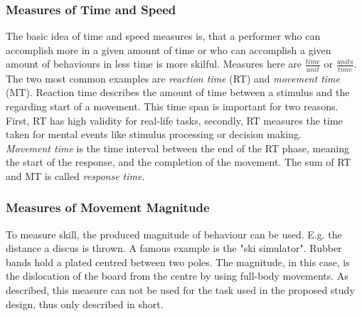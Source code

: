 \subsubsection{Measures of Time and Speed}
\label{section:timeandspeed}
The basic idea of time and speed measures is, that a performer who can accomplish more in a given amount of time or who can accomplish a given amount of behaviours in less time is more skilful. Measures here are
$\frac{time}{unit}$ or $\frac{units}{time}$.\\
The two most common examples are \textit{reaction time} (RT) and \textit{movement time} (MT). Reaction time describes the amount of time between a stimulus and the regarding start of a movement. This time span is important for two reasons. First, RT has high validity for real-life tasks, secondly, RT measures the time taken for mental events like stimulus processing or decision making.\\
\textit{Movement time} is the time interval between the end of the RT phase, meaning the start of the response, and the completion of the movement. The sum of RT and MT is called \textit{response time}.

\subsubsection{Measures of Movement Magnitude}
To measure skill, the produced magnitude of behaviour can be used. E.g. the distance a discus is thrown. A famous example is the "ski simulator". Rubber bands hold a plated centred between two poles. The magnitude, in this case, is the dislocation of the board from the centre by using full-body movements. As described, this measure can not be used for the task used in the proposed study design, thus only described in short.

